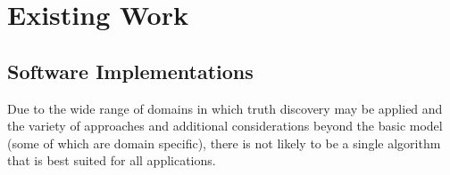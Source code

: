 \documentclass[../main.tex]{subfiles}
\begin{document}







\section{Existing Work}
\subsection{Software Implementations}
\label{sec:background_software}

Due to the wide range of domains in which truth discovery may be applied and
the variety of approaches and additional considerations beyond the basic model
(some of which are domain specific), there is not likely to be a single
algorithm that is best suited for all applications.
\end{document}
